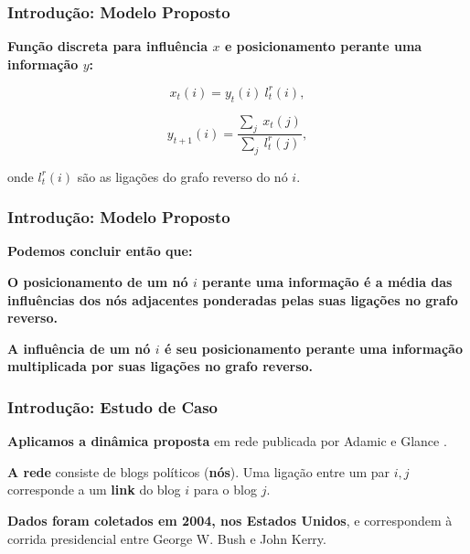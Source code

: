 \begin{frame}
  \frametitle{Introdução: Modelo Proposto}

  \textbf{Função discreta para influência $x$ e posicionamento perante
  uma informação $y$:}

  \begin{alertblock}{}

    \begin{equation}
      x_{t}(i) = y_{t}(i) \  l_{t}^{r}(i),
    \end{equation}

    \begin{equation}
      y_{t+1}(i) = \frac{\sum_{j} \  x_{t}(j)}{\sum_{j} \  l_{t}^{r}(j)},
    \end{equation}

  \end{alertblock}
  \vspace{5mm}

  onde $l_{t}^{r}(i)$ são as ligações do grafo reverso do nó $i$.
\end{frame}

\begin{frame}
  \frametitle{Introdução: Modelo Proposto}

  \textbf{Podemos concluir então que:}

  \begin{alertblock}{}
    \vspace{5mm}

    \textbf{\alert{O posicionamento de um nó $i$ perante uma informação} é a
      média das influências dos nós adjacentes ponderadas pelas suas ligações
      no grafo reverso.}
    \vspace{5mm}

    \textbf{\alert{A influência de um nó $i$} é seu posicionamento perante uma
      informação multiplicada por suas ligações no grafo reverso.}
    \vspace{5mm}

  \end{alertblock}
\end{frame}

\begin{frame}
  \frametitle{Introdução: Estudo de Caso}

  \begin{alertblock}{}
    \vspace{5mm}

    \textbf{\alert{Aplicamos a dinâmica proposta}} em rede publicada por Adamic e Glance
      \cite{Adamic:2005:PoliticalBlogs}.
    \vspace{5mm}

    \textbf{\alert{A rede}} consiste de blogs políticos (\textbf{nós}). Uma
      ligação entre um par $i, j$ corresponde a um \textbf{link} do blog $i$ para
      o blog $j$.
    \vspace{5mm}

    \textbf{\alert{Dados foram coletados em 2004, nos Estados Unidos}}, e
      correspondem à corrida presidencial entre George W. Bush e John Kerry.
    \vspace{5mm}

  \end{alertblock}
\end{frame}

